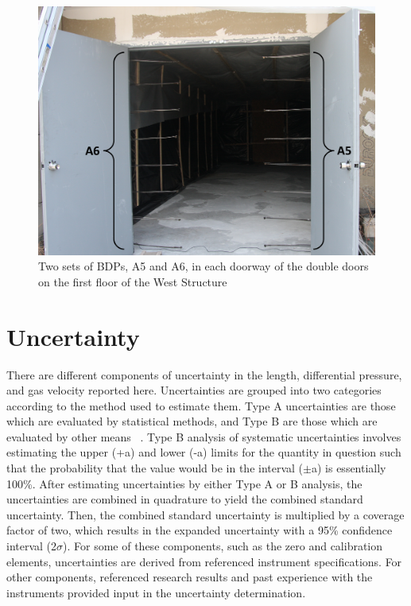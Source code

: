 \documentclass[12pt,oneside]{book}
\begin{document}
\begin{figure}[!ht]
\includegraphics[width=6in]{../../Figures/BDPs}
\caption[Two sets of BDPs in Doorway]{Two sets of BDPs, A5 and A6, in each doorway of the double doors on the first floor of the West Structure}
\label{fig:BDPs}
\end{figure}

\section{Uncertainty}
\label{sec:Uncertainty}
There are different components of uncertainty in the length, differential pressure, and gas velocity reported here. Uncertainties are grouped into two categories according to the method used to estimate them. Type A uncertainties are those which are evaluated by statistical methods, and Type B are those which are evaluated by other means ~\cite{Taylor&Kuyatt:1994}. Type B analysis of systematic uncertainties involves estimating the upper (+a) and lower (-a) limits for the quantity in question such that the probability that the value would be in the interval ($\pm$a) is essentially 100\%. After estimating uncertainties by either Type A or B analysis, the uncertainties are combined in quadrature to yield the combined standard uncertainty. Then, the combined standard uncertainty is multiplied by a coverage factor of two, which results in the expanded uncertainty with a 95\% confidence interval (2$\sigma$). For some of these components, such as the zero and calibration elements, uncertainties are derived from referenced instrument specifications. For other components, referenced research results and past experience with the instruments provided input in the uncertainty determination. 
\end{document}
